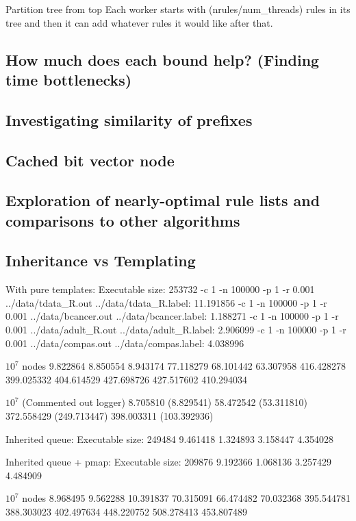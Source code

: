\documentclass[]{article}
\theoremstyle{definition}
\begin{document}
Partition tree from top
	Each worker starts with (nrules/num\_threads) rules in its tree and then it can add whatever rules it would like after that.

\subsection{How much does each bound help? (Finding time bottlenecks)}

\subsection{Investigating similarity of prefixes}

\subsection{Cached bit vector node}

\subsection{Exploration of nearly-optimal rule lists and comparisons to other algorithms}

\subsection{Inheritance vs Templating}


With pure templates:
Executable size: 253732
-c 1 -n 100000 -p 1 -r 0.001 ../data/tdata\_R.out ../data/tdata\_R.label: 11.191856
-c 1 -n 100000 -p 1 -r 0.001 ../data/bcancer.out ../data/bcancer.label: 1.188271
-c 1 -n 100000 -p 1 -r 0.001 ../data/adult\_R.out ../data/adult\_R.label: 2.906099
-c 1 -n 100000 -p 1 -r 0.001 ../data/compas.out ../data/compas.label: 4.038996

$10^7$ nodes
9.822864 8.850554 8.943174
77.118279 68.101442 63.307958
416.428278 399.025332 404.614529
427.698726 427.517602 410.294034

$10^7$ (Commented out logger)
8.705810 (8.829541)
58.472542 (53.311810)
372.558429 (249.713447)
398.003311 (103.392936)

Inherited queue:
Executable size: 249484
9.461418
1.324893
3.158447
4.354028

Inherited queue + pmap:
Executable size: 209876
9.192366
1.068136
3.257429
4.484909

$10^7$ nodes
8.968495 9.562288 10.391837
70.315091 66.474482 70.032368
395.544781 388.303023 402.497634
448.220752 508.278413 453.807489
\end{document}
